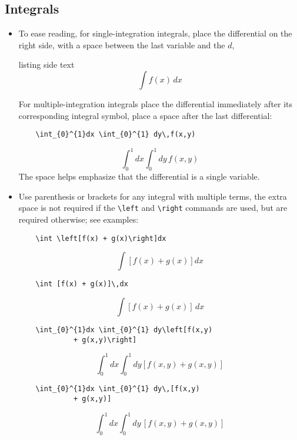 \documentclass[10pt, letter]{article}
\begin{document}
\begin{multicols}{2}
\subsection{Integrals}\label{sec:integrals}
\begin{itemize}
\item To ease reading, for single-integration integrals, place the
  differential on the right side, with a space between the last
  variable and the $d$,
  \begin{tcblisting}{listing side text}
    \begin{equation*}
      \int f(x)\,dx
    \end{equation*}
  \end{tcblisting}
  For multiple-integration integrals place the differential immediately after its corresponding
  integral symbol, place a space after the last differential:
\begin{lstlisting}
    \int_{0}^{1}dx \int_{0}^{1} dy\,f(x,y)
\end{lstlisting}
  \begin{equation*}
    \int_{0}^{1}dx \int_{0}^{1} dy\,f(x,y)
  \end{equation*}
  The space helps emphasize that the differential is a single variable. 
\item Use parenthesis or brackets for any integral with multiple
  terms, the extra space is not required if the \verb|\left| and
    \verb|\right| commands are used, but are required otherwise; see examples:
\begin{lstlisting}
    \int \left[f(x) + g(x)\right]dx
\end{lstlisting}
  \begin{equation*}
    \int \left[f(x) + g(x)\right]dx
  \end{equation*}
  \begin{lstlisting}
    \int [f(x) + g(x)]\,dx
\end{lstlisting}
  \begin{equation*}
    \int [f(x) + g(x)]\,dx
  \end{equation*}
\begin{lstlisting}
    \int_{0}^{1}dx \int_{0}^{1} dy\left[f(x,y) 
             + g(x,y)\right]
\end{lstlisting}
  \begin{equation*}
    \int_{0}^{1}dx \int_{0}^{1} dy\left[f(x,y) + g(x,y)\right]
  \end{equation*}
\begin{lstlisting}
    \int_{0}^{1}dx \int_{0}^{1} dy\,[f(x,y) 
             + g(x,y)]
\end{lstlisting}
  \begin{equation*}
    \int_{0}^{1}dx \int_{0}^{1} dy\,[f(x,y) + g(x,y)]
  \end{equation*}
\end{itemize}





\end{multicols}
\end{document}
